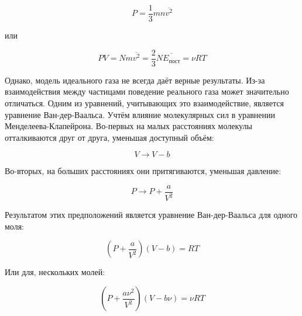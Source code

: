 \begin{equation*}
    P = \frac{1}{3} m n \overline{v^2}
\end{equation*}

\noindent
или

\begin{equation}
    P V = N m \overline{v^2} = \frac{2}{3} N \overline{E_\text{пост}} = \nu R T
\end{equation}

Однако, модель идеального газа не всегда даёт верные результаты. Из-за взаимодействия между частицами поведение реального газа может значительно отличаться. Одним из уравнений, учитывающих это взаимодействие, является уравнение Ван-дер-Ваальса. Учтём влияние молекулярных сил в уравнении Менделеева-Клапейрона. Во-первых на малых расстояниях молекулы отталкиваются друг от друга, уменьшая доступный объём:

\begin{equation*}
    V \to V - b
\end{equation*}

\noindent
Во-вторых, на больших расстояниях они притягиваются, уменьшая давление:

\begin{equation*}
    P \to P + \frac{a}{V^2}
\end{equation*}

\noindent
Результатом этих предположений является уравнение Ван-дер-Ваальса для одного моля:

\begin{equation}
    \left( P + \frac{a}{V^2} \right) \left( V - b \right) = R T
\end{equation}

\noindent
Или для, нескольких молей:

\begin{equation}
    \left( P + \frac{a \nu^2}{V^2} \right) \left( V - b \nu \right) = \nu R T
\end{equation}